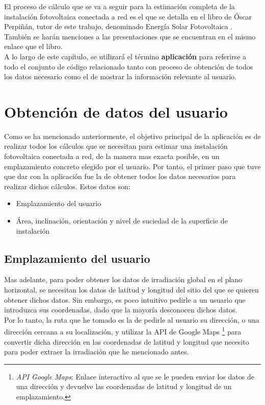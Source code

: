 
El proceso de cálculo que se va a seguir para la estimación completa de la instalación fotovoltaica conectada a red es el que se detalla en el libro de Óscar Perpiñán, tutor de este trabajo, denominado Energía Solar Fotovoltaica \cite{esf_book}. También se harán menciones a las presentaciones que se encuentran en el mismo enlace que el libro.\\

A lo largo de este capítulo, se utilizará el término \textbf{aplicación} para referirse a todo el conjunto de código relacionado tanto con proceso de obtención de todos los datos necesario como el de mostrar la información relevante al usuario.

\section{Obtención de datos del usuario}
Como se ha mencionado anteriormente, el objetivo principal de la aplicación es de realizar todos los cálculos que se necesitan para estimar una instalación fotovoltaica conectada a red, de la manera mas exacta posible,  en un emplazamiento concreto elegido por el usuario. Por tanto, el primer paso que tuve que dar con la aplicación fue la de obtener todos los datos necesarios para realizar dichos cálculos.
Estos datos son:
\begin{itemize}
\item Emplazamiento del usuario
\item Área, inclinación, orientación y nivel de suciedad de la superficie de instalación
\end{itemize}
\subsection{Emplazamiento del usuario}
Mas adelante, para poder obtener los datos de irradiación global en el plano horizontal, se necesitan los datos de latitud y longitud del sitio del que se quieren obtener dichos datos. Sin embargo, es poco intuitivo pedirle a un usuario que introduzca sus coordenadas, dado que la mayoría desconocen dichos datos.\\
Por lo tanto, la ruta que he tomado es la de pedirle al usuario su dirección, o una dirección cercana a su localización, y utilizar la API de Google Maps \footnote{\textit{API Google Maps}: Enlace interactivo al que se le pueden enviar los datos de una dirección y devuelve las coordenadas de latitud y longitud de un emplazamiento.  } para convertir dicha dirección en las coordenadas de latitud y longitud que necesito para poder extraer la irradiación que he mencionado antes.\\

